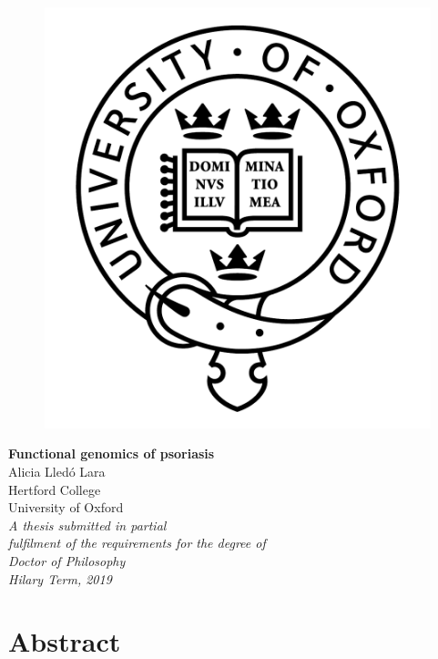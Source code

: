 \begin{titlepage}
   \centering
   \begin{figure}
      \centering
      \includegraphics[scale=0.4]{oxford_logo-eps-converted-to.pdf}
   \end{figure}
   {\LARGE{\textbf{Functional genomics of psoriasis}}}\\ 
    \vspace{2cm}
   {\Large{Alicia Lled\'{o} Lara}}\\
   {\Large{Hertford College}}\\
   {\Large{University of Oxford}}\\
   \vspace{2cm}   
   {\Large{\textit{A thesis submitted in partial \\ fulfilment of the requirements for the degree of\\ Doctor of Philosophy}}}\\
   {\Large{\textit{Hilary Term, 2019}}}
\end{titlepage}

\newpage
\chapter*{Abstract} %
\thispagestyle{plain}
 \setcounter{page}{1}

